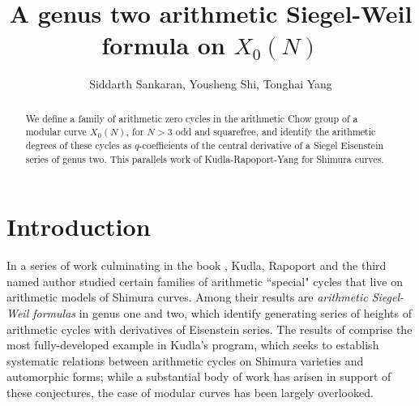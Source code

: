 \documentclass[reqno,oneside]{amsart}
\title{A genus two arithmetic Siegel-Weil formula on $X_0(N)$}
\author{Siddarth Sankaran, Yousheng Shi, Tonghai Yang}
\date{}
\theoremstyle{plain}
\theoremstyle{remark}
\numberwithin{theorem}{section}
\begin{document}
	\maketitle
	
	\begin{abstract}
		We define a family of arithmetic zero cycles in the arithmetic Chow group of a modular curve $X_0(N)$, for $N>3$ odd and squarefree, and identify the arithmetic degrees of these cycles as $q$-coefficients of the central derivative of a Siegel Eisenstein series of genus two. This parallels work of Kudla-Rapoport-Yang for Shimura curves.
	\end{abstract}
	
	
	\tableofcontents
	

	
	
	\section{Introduction}
	
	In a series of work culminating in the book \cite{KRYbook}, Kudla, Rapoport and the third named author studied certain families of arithmetic ``special" cycles that live on arithmetic models of Shimura curves. Among their results are  \emph{arithmetic Siegel-Weil formulas} in genus one and two, which identify generating series of heights of arithmetic  cycles with derivatives of Eisenstein series. The results of \cite{KRYbook} comprise the most fully-developed example in Kudla's program, which seeks to establish systematic relations between arithmetic cycles on Shimura varieties and automorphic forms; while a substantial body of work has arisen in support of these conjectures, the case of modular curves has been largely overlooked.
	
\end{document}
